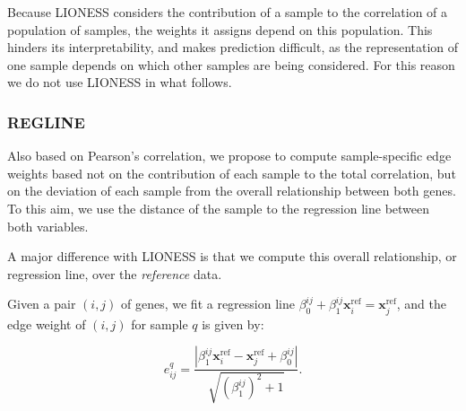\documentclass{bioinfo}
\newcommand{\xmat}{X}
\newcommand{\xx}{\bm{x}}
\newcommand{\xref}{{\bm x}^{\mbox{ref}}}
\begin{document}
\begin{methods}


Because LIONESS considers the contribution of a sample to the correlation of a population of samples, the weights it assigns depend on this population. This hinders its interpretability, and makes prediction difficult, as the representation of one sample depends on which other samples are being considered. For this reason we do not use LIONESS in what follows.

\subsubsection{REGLINE}
Also based on Pearson's correlation, we propose to compute sample-specific edge weights based not on the contribution of each sample to the total correlation, but on the deviation of each sample from the overall relationship between both genes. To this aim, we use the distance of the sample to the regression line between both variables.

A major difference with LIONESS is that we compute this overall relationship, or regression line, over the {\em reference} data.

Given a pair $(i, j)$ of genes, we fit a regression line $\beta_0^{ij} + \beta_1^{ij} \xref_i = \xref_j$, and the edge weight of $(i, j)$ for sample $q$ is given by:

\[
e_{ij}^q = \frac{|\beta_1^{ij} \xref_i - \xref_j + \beta_0^{ij}|}{\sqrt{(\beta_1^{ij})^2+1}}.
\]


\end{methods}
\end{document}
